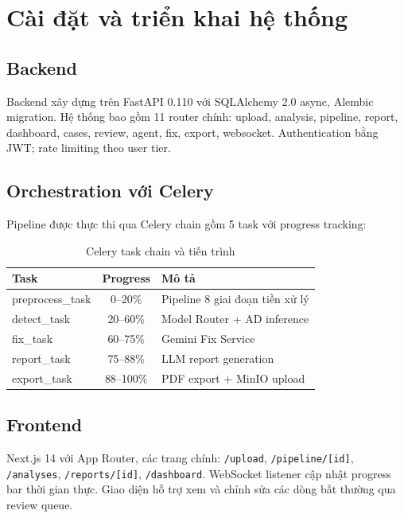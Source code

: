\section{Cài đặt và triển khai hệ thống}

\subsection{Backend}

Backend xây dựng trên FastAPI 0.110 với SQLAlchemy 2.0 async, Alembic migration. Hệ thống bao gồm 11 router chính: upload, analysis, pipeline, report, dashboard, cases, review, agent, fix, export, websocket. Authentication bằng JWT; rate limiting theo user tier.

\subsection{Orchestration với Celery}

Pipeline được thực thi qua Celery chain gồm 5 task với progress tracking:

\begin{table}[h!]
\centering
\fontsize{13pt}{14.95pt}\selectfont
\caption{Celery task chain và tiến trình}
\label{tab:celery}
\begin{tabularx}{\textwidth}{|>{\raggedright\arraybackslash}p{3.5cm}|c|>{\raggedright\arraybackslash}X|}
\hline
\textbf{Task} & \textbf{Progress} & \textbf{Mô tả} \\
\hline
preprocess\_task & 0--20\% & Pipeline 8 giai đoạn tiền xử lý \\
\hline
detect\_task & 20--60\% & Model Router + AD inference \\
\hline
fix\_task & 60--75\% & Gemini Fix Service \\
\hline
report\_task & 75--88\% & LLM report generation \\
\hline
export\_task & 88--100\% & PDF export + MinIO upload \\
\hline
\end{tabularx}
\end{table}

\subsection{Frontend}

Next.js 14 với App Router, các trang chính: \texttt{/upload}, \texttt{/pipeline/[id]}, \texttt{/analyses}, \texttt{/reports/[id]}, \texttt{/dashboard}. WebSocket listener cập nhật progress bar thời gian thực. Giao diện hỗ trợ xem và chỉnh sửa các dòng bất thường qua review queue.

